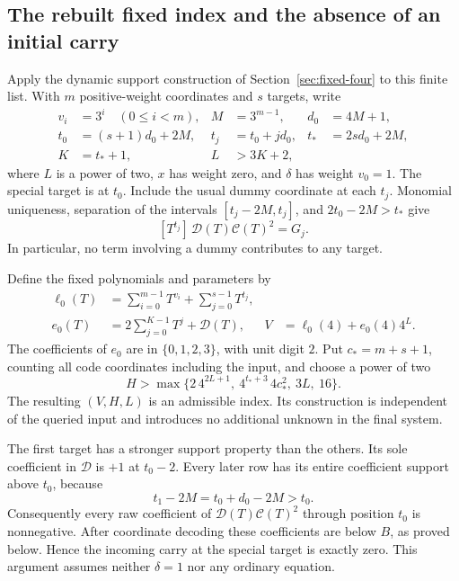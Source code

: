 \subsection{The rebuilt fixed index and the absence of an initial carry}

Apply the dynamic support construction of Section~\ref{sec:fixed-four}
to this finite list. With $m$ positive-weight coordinates and $s$
targets, write
\begin{align*}
 v_i&=3^i\quad(0\le i<m),& M&=3^{m-1},& d_0&=4M+1,\\
 t_0&=(s+1)d_0+2M,& t_j&=t_0+jd_0,& t_*&=2sd_0+2M,\\
 K&=t_*+1,& L&>3K+2,
\end{align*}
where $L$ is a power of two, $x$ has weight zero, and $\delta$ has
weight $v_0=1$. The special target is at $t_0$. Include the usual
dummy coordinate at each $t_j$. Monomial uniqueness, separation of
the intervals $[t_j-2M,t_j]$, and $2t_0-2M>t_*$ give
\begin{equation}\label{eq:half-center-coefficient}
 [T^{t_j}]\,\mathcal D(T)\mathcal C(T)^2=G_j.
\end{equation}
In particular, no term involving a dummy contributes to any target.

Define the fixed polynomials and parameters by
\begin{align*}
 \ell_0(T)&=\sum_{i=0}^{m-1}T^{v_i}+\sum_{j=0}^{s-1}T^{t_j},\\
 e_0(T)&=2\sum_{j=0}^{K-1}T^j+\mathcal D(T),&
 V&=\ell_0(4)+e_0(4)4^L.
\end{align*}
The coefficients of $e_0$ are in $\{0,1,2,3\}$, with unit digit
$2$. Put $c_*=m+s+1$, counting all code coordinates including the
input, and choose a power of two
\begin{equation}\label{eq:half-center-index-bound}
 H>\max\{2\,4^{2L+1},\ 4^{t_*+3}\,4c_*^2,\ 3L,\ 16\}.
\end{equation}
The resulting $(V,H,L)$ is an admissible index. Its construction is
independent of the queried input and introduces no additional
unknown in the final system.

The first target has a stronger support property than the others.
Its sole coefficient in $\mathcal D$ is $+1$ at $t_0-2$.
Every later row has its entire coefficient support above $t_0$,
because
\[
 t_1-2M=t_0+d_0-2M>t_0.
\]
Consequently every raw coefficient of
$\mathcal D(T)\mathcal C(T)^2$ through position $t_0$ is
nonnegative. After coordinate decoding these coefficients are below
$B$, as proved below. Hence the incoming carry at the special target
is exactly zero. This argument assumes neither $\delta=1$ nor any
ordinary equation.

